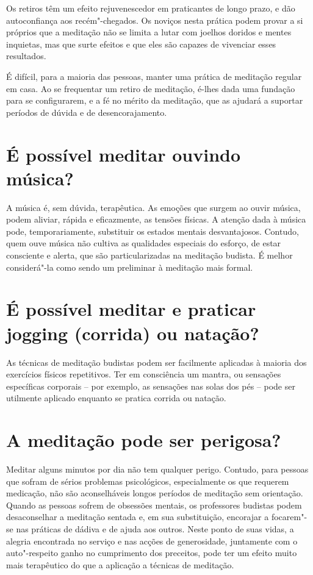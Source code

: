 Os retiros têm um efeito rejuvenescedor em praticantes de longo prazo, e
dão autoconfiança aos recém"-chegados. Os noviços nesta prática podem
provar a si próprios que a meditação não se limita a lutar com joelhos
doridos e mentes inquietas, mas que surte efeitos e que eles são
capazes de vivenciar esses resultados.

É difícil, para a maioria das pessoas, manter uma prática de meditação
regular em casa. Ao se frequentar um retiro de meditação, é-lhes dada
uma fundação para se configurarem, e a fé no mérito da meditação, que as
ajudará a suportar períodos de dúvida e de desencorajamento.

\section{É possível meditar ouvindo música?}

A música é, sem dúvida, terapêutica. As emoções que surgem ao ouvir
música, podem aliviar, rápida e eficazmente, as tensões físicas. A
atenção dada à música pode, temporariamente, substituir os estados
mentais desvantajosos. Contudo, quem ouve música não cultiva as
qualidades especiais do esforço, de estar consciente e alerta, que são
particularizadas na meditação budista. É melhor considerá"-la como sendo
um preliminar à meditação mais formal.

\section{É possível meditar e praticar jogging (corrida) ou natação?}

As técnicas de meditação budistas podem ser facilmente aplicadas à
maioria dos exercícios físicos repetitivos. Ter em consciência um
mantra, ou sensações específicas corporais -- por exemplo, as sensações
nas solas dos pés -- pode ser utilmente aplicado enquanto se pratica
corrida ou natação.

\section{A meditação pode ser perigosa?}

Meditar alguns minutos por dia não tem qualquer perigo. Contudo, para
pessoas que sofram de sérios problemas psicológicos, especialmente os
que requerem medicação, não são aconselháveis longos períodos de
meditação sem orientação. Quando as pessoas sofrem de obsessões mentais,
os professores budistas podem desaconselhar a meditação sentada e, em
sua substituição, encorajar a focarem"-se nas práticas de dádiva e de
ajuda aos outros. Neste ponto de suas vidas, a alegria encontrada no
serviço e nas acções de generosidade, juntamente com o auto"-respeito
ganho no cumprimento dos preceitos, pode ter um efeito muito mais
terapêutico do que a aplicação a técnicas de meditação.

